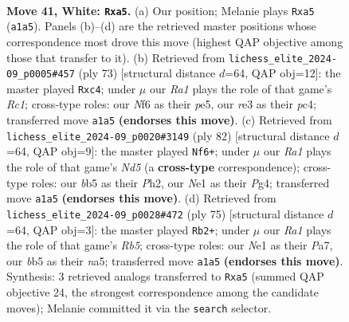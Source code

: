 \documentclass[11pt]{article}
\begin{document}
\clearpage

\begin{figure}[p]\centering
\begin{subfigure}{0.46\textwidth}\centering
\resizebox{\linewidth}{!}{%
\newchessgame
\chessboard[
  setfen={2r5/1k3B2/5N2/pb3p2/7R/4r3/1P4P1/R2KN3 w - - 0 41},
  showmover=false,
  pgfstyle=straightmove, color=movearrow, markmove={a1-a5}
]}
\caption{}
\end{subfigure}\hfill
\begin{subfigure}{0.46\textwidth}\centering
\resizebox{\linewidth}{!}{%
\newchessgame
\chessboard[
  setfen={2r1k3/5p1p/R7/3nPp2/1pP5/5P2/3K1BPP/8 b - - 0 37},
  showmover=false,
  pgfstyle=straightmove, color=movearrow, markmove={c8-c4}
]}
\caption{}
\end{subfigure}
\\[4pt]
\begin{subfigure}{0.46\textwidth}\centering
\resizebox{\linewidth}{!}{%
\newchessgame
\chessboard[
  setfen={4k3/R4p2/3p2p1/3N4/4r1P1/1PK5/3R3P/8 w - - 1 42},
  showmover=false,
  pgfstyle=straightmove, color=movearrow, markmove={d5-f6}
]}
\caption{}
\end{subfigure}\hfill
\begin{subfigure}{0.46\textwidth}\centering
\resizebox{\linewidth}{!}{%
\newchessgame
\chessboard[
  setfen={1k6/p5R1/4pp2/N1p5/1r6/4P3/P3Kn2/8 b - - 1 38},
  showmover=false,
  pgfstyle=straightmove, color=movearrow, markmove={b4-b2}
]}
\caption{}
\end{subfigure}
\caption{\textbf{Move 41, White: \texttt{Rxa5}.} (a) Our position; Melanie plays \texttt{Rxa5} (\texttt{a1a5}). Panels (b)--(d) are the retrieved master positions whose correspondence most drove this move (highest QAP objective among those that transfer to it). (b) Retrieved from \texttt{lichess\_elite\_2024-09\_p0005\#457} (ply 73) [structural distance $d$=64, QAP obj=12]: the master played \texttt{Rxc4}; under $\mu$ our \emph{Ra1} plays the role of that game's \emph{Rc1}; cross-type roles: our \emph{N}f6 as their \emph{p}e5, our \emph{r}e3 as their \emph{p}c4; transferred move \texttt{a1a5} \textbf{(endorses this move)}. (c) Retrieved from \texttt{lichess\_elite\_2024-09\_p0020\#3149} (ply 82) [structural distance $d$=64, QAP obj=9]: the master played \texttt{Nf6+}; under $\mu$ our \emph{Ra1} plays the role of that game's \emph{Nd5} (a \textbf{cross-type} correspondence); cross-type roles: our \emph{b}b5 as their \emph{P}h2, our \emph{N}e1 as their \emph{P}g4; transferred move \texttt{a1a5} \textbf{(endorses this move)}. (d) Retrieved from \texttt{lichess\_elite\_2024-09\_p0028\#472} (ply 75) [structural distance $d$=64, QAP obj=3]: the master played \texttt{Rb2+}; under $\mu$ our \emph{Ra1} plays the role of that game's \emph{Rb5}; cross-type roles: our \emph{N}e1 as their \emph{P}a7, our \emph{b}b5 as their \emph{n}a5; transferred move \texttt{a1a5} \textbf{(endorses this move)}. Synthesis: 3 retrieved analogs transferred to \texttt{Rxa5} (summed QAP objective 24, the strongest correspondence among the candidate moves); Melanie committed it via the \texttt{search} selector.}
\label{fig:thought-m80}
\end{figure}
\end{document}
